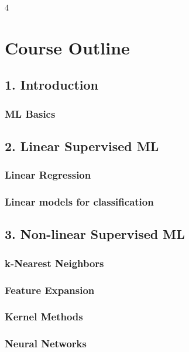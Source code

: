 \documentclass[8pt,a4paper,landscape]{extarticle}
\begin{document}
\begin{multicols*}{4}


\iffalse%
\section{Course Outline}

\subsection{1. Introduction}
\subsubsection{ML Basics}

\subsection{2. Linear Supervised ML}
\subsubsection{Linear Regression}
\subsubsection{Linear models for classification}

\subsection{3. Non-linear Supervised ML}
\subsubsection{k-Nearest Neighbors}
\subsubsection{Feature Expansion}
\subsubsection{Kernel Methods}
\subsubsection{Neural Networks}


\end{multicols*}
\end{document}
